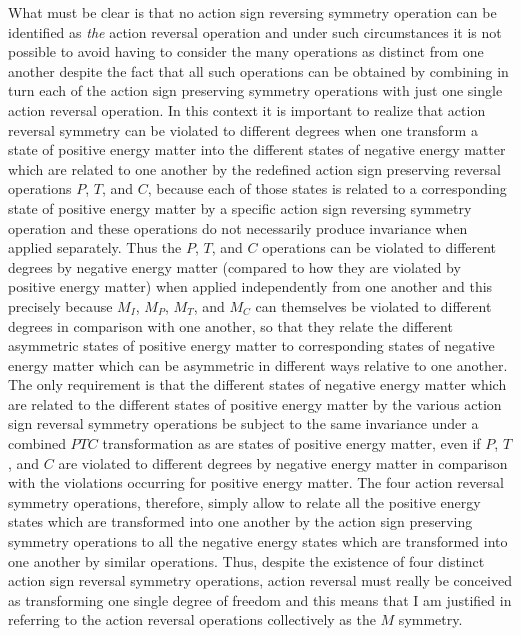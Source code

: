 \documentclass[notitlepage,12pt]{report}
\begin{document}
What must be clear is that no action sign reversing symmetry operation can be identified as \textit{the} action reversal operation and under such circumstances it is not possible to avoid having to consider the many operations as distinct from one another despite the fact that all such operations can be obtained by combining in turn each of the action sign preserving symmetry operations with just one single action reversal operation. In this context it is important to realize that action reversal symmetry can be violated to different degrees when one transform a state of positive energy matter into the different states of negative energy matter which are related to one another by the redefined action sign preserving reversal operations $P$, $T$, and $C$, because each of those states is related to a corresponding state of positive energy matter by a specific action sign reversing symmetry operation and these operations do not necessarily produce invariance when applied separately. Thus the $P$, $T$, and $C$ operations can be violated to different degrees by negative energy matter (compared to how they are violated by positive energy matter) when applied independently from one another and this precisely because $M_I$, $M_P$, $M_T$, and $M_C$ can themselves be violated to different degrees in comparison with one another, so that they relate the different asymmetric states of positive energy matter to corresponding states of negative energy matter which can be asymmetric in different ways relative to one another. The only requirement is that the different states of negative energy matter which are related to the different states of positive energy matter by the various action sign reversal symmetry operations be subject to the same invariance under a combined $PTC$ transformation as are states of positive energy matter, even if $P$, $T$, and $C$ are violated to different degrees by negative energy matter in comparison with the violations occurring for positive energy matter. The four action reversal symmetry operations, therefore, simply allow to relate all the positive energy states which are transformed into one another by the action sign preserving symmetry operations to all the negative energy states which are transformed into one another by similar operations. Thus, despite the existence of four distinct action sign reversal symmetry operations, action reversal must really be conceived as transforming one single degree of freedom and this means that I am justified in referring to the action reversal operations collectively as the $M$ symmetry.
\end{document}
